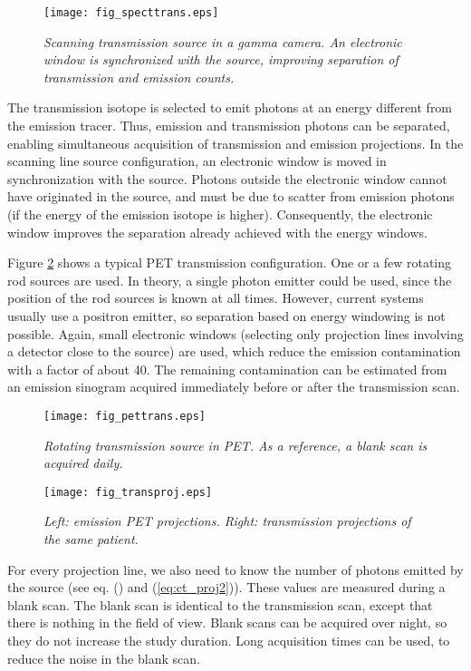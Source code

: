 \begin{figure}[tb]
\centering
\texttt{[image: fig\_specttrans.eps]}
\caption{\label{fig:specttrans} \emph{Scanning transmission source in a gamma
camera. An electronic window is synchronized with the source, improving
separation of transmission and emission counts.}}
\end{figure}

The transmission isotope is selected to emit photons at an energy
different from the emission tracer. Thus, emission and transmission
photons can be separated, enabling simultaneous acquisition of
transmission and emission projections. In the scanning line source
configuration, an electronic window is moved in synchronization
with the source. Photons outside the electronic window cannot have
originated in the source, and must be due to scatter from emission
photons (if the energy of the emission isotope is
higher). Consequently, the electronic window improves the separation
already achieved with the energy windows.

Figure \ref{fig:pettrans} shows a typical PET transmission
configuration. One or a few rotating rod sources are used. In theory,
a single photon emitter could be used, since the position of the rod
sources is known at all times. However, current systems usually use a
positron emitter, so separation based on energy windowing is not
possible. Again, small electronic windows (selecting only projection
lines involving a detector close to the source) are used, which reduce
the emission contamination with a factor of about 40. The remaining
contamination can be estimated from an emission sinogram acquired
immediately before or after the transmission scan.

\begin{figure}[tb]
\centering
\texttt{[image: fig\_pettrans.eps]}
\caption{\label{fig:pettrans} \emph{Rotating transmission source in PET. As a
reference, a blank scan is acquired daily.}}
\end{figure}

\begin{figure}[tb]
\centering
\texttt{[image: fig\_transproj.eps]}
\caption{\label{fig:transproj} \emph{Left: emission PET projections. Right:
transmission projections of the same patient.}}
\end{figure}

For every projection line, we also need to know the number of photons
emitted by the source (see eq. () and
(\ref{eq:ct_proj2})). These values are measured during a blank
scan. The blank scan is identical to the transmission scan, except
that there is nothing in the field of view. Blank scans can be
acquired over night, so they do not increase the study duration. Long
acquisition times can be used, to reduce the noise in the blank scan.

